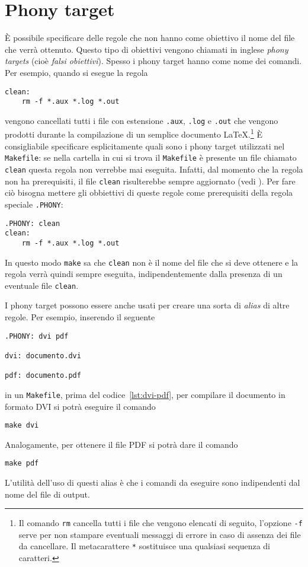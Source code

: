 \section{Phony target}
\label{sec:phony}

È possibile specificare delle regole che non hanno come obiettivo il nome del
file che verrà ottenuto.  Questo tipo di obiettivi vengono chiamati in inglese
\emph{phony targets} (cioè \emph{falsi obiettivi}).  Spesso i phony target hanno
come nome dei comandi. Per esempio, quando si esegue la regola
\begin{lstlisting}
clean:
	rm -f *.aux *.log *.out
\end{lstlisting}
vengono cancellati tutti i file con estensione \verb|.aux|, \verb|.log| e
\verb|.out| che vengono prodotti durante la compilazione di un semplice
documento
\LaTeX.\footnote{Il comando \texttt{rm} cancella tutti i file che vengono
  elencati di seguito, l'opzione \texttt{-f} serve per non stampare eventuali
  messaggi di errore in caso di assenza dei file da cancellare.  Il
  metacarattere \texttt{*} sostituisce una qualsiasi sequenza di caratteri.}
È consigliabile specificare esplicitamente quali sono i phony target utilizzati
nel \verb|Makefile|: se nella cartella in cui si trova il \verb|Makefile| è
presente un file chiamato \verb|clean| questa regola non verrebbe mai eseguita.
Infatti, dal momento che la regola non ha prerequisiti, il file \texttt{clean}
risulterebbe sempre aggiornato (vedi \textcite[31]{gnu:make}).  Per fare ciò
bisogna mettere gli obbiettivi di queste regole come prerequisiti della regola
speciale \verb|.PHONY|:
\begin{lstlisting}
.PHONY: clean
clean:
	rm -f *.aux *.log *.out
\end{lstlisting}
In questo modo \verb|make| sa che \verb|clean| non è il nome del file che si
deve ottenere e la regola verrà quindi sempre eseguita, indipendentemente dalla
presenza di un eventuale file \verb|clean|.

I phony target possono essere anche usati per creare una sorta di \emph{alias}
di altre regole.  Per esempio, inserendo il seguente
\begin{lstlisting}[caption=I prerequisiti della regola dell'obiettivo \texttt{.PHONY}
sono i nomi dei phony target che vengono successivamente specificati,label=lst:phony]
.PHONY: dvi pdf

dvi: documento.dvi

pdf: documento.pdf
\end{lstlisting}
in un \verb|Makefile|, prima del codice~\ref{lst:dvi-pdf}, per compilare il
documento in formato \textsc{DVI} si potrà eseguire il comando
\begin{verbatim}
make dvi
\end{verbatim}
Analogamente, per ottenere il file \textsc{PDF} si potrà dare il comando
\begin{verbatim}
make pdf
\end{verbatim}
L'utilità dell'uso di questi alias è che i comandi da eseguire sono indipendenti
dal nome del file di output.

